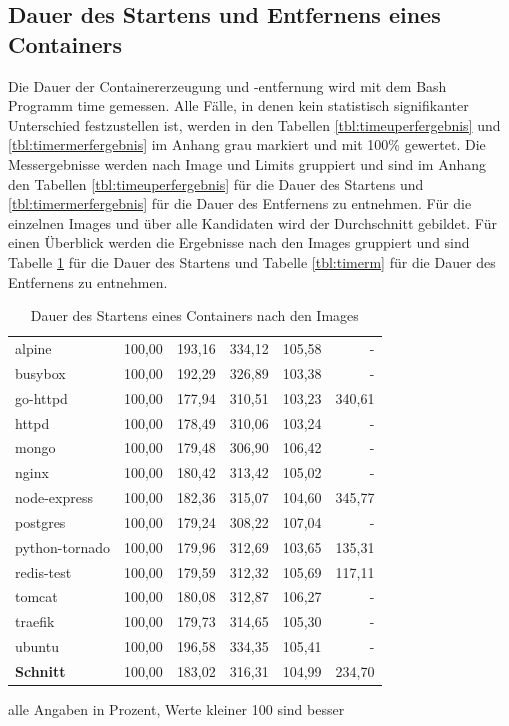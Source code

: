 \subsection{Dauer des Startens und Entfernens eines Containers}
Die Dauer der Containererzeugung und -entfernung wird mit dem Bash Programm time gemessen. Alle Fälle, in denen kein statistisch signifikanter Unterschied festzustellen ist, werden in den Tabellen \ref{tbl:timeuperfergebnis} und \ref{tbl:timermerfergebnis} im Anhang grau markiert und mit 100\% gewertet. Die Messergebnisse werden nach Image und Limits gruppiert und sind im Anhang den Tabellen \ref{tbl:timeuperfergebnis} für die Dauer des Startens und \ref{tbl:timermerfergebnis} für die Dauer des Entfernens zu entnehmen. Für die einzelnen Images und über alle Kandidaten wird der Durchschnitt gebildet. Für einen Überblick werden die Ergebnisse nach den Images gruppiert und sind Tabelle \ref{tbl:timeup} für die Dauer des Startens und Tabelle \ref{tbl:timerm} für die Dauer des Entfernens zu entnehmen.

\begin{table}[h]
	\myfloatalign
	\small 
	\begin{tabularx}{\textwidth}{Xrrrrr} \hline
		\spacedlowsmallcaps{Image} & \spacedlowsmallcaps{Docker} & \spacedlowsmallcaps{Kata} & \spacedlowsmallcaps{Kata FC} & \spacedlowsmallcaps{gVisor} & \spacedlowsmallcaps{Nabla} \\ \hline
		alpine        & 100,00 & 193,16 & 334,12  & 105,58 & -      \\
		busybox       & 100,00 & 192,29 & 326,89  & 103,38 & -      \\
		go-httpd      & 100,00 & 177,94 & 310,51  & 103,23 & 340,61 \\
		httpd         & 100,00 & 178,49 & 310,06  & 103,24 & -      \\
		mongo         & 100,00 & 179,48 & 306,90  & 106,42 & -      \\
		nginx         & 100,00 & 180,42 & 313,42  & 105,02 & -      \\
		node-express  & 100,00 & 182,36 & 315,07  & 104,60 & 345,77 \\
		postgres      & 100,00 & 179,24 & 308,22  & 107,04 & -      \\
		python-tornado& 100,00 & 179,96 & 312,69  & 103,65 & 135,31 \\
		redis-test    & 100,00 & 179,59 & 312,32  & 105,69 & 117,11 \\
		tomcat        & 100,00 & 180,08 & 312,87  & 106,27 & -      \\
		traefik       & 100,00 & 179,73 & 314,65  & 105,30 & -      \\
		ubuntu        & 100,00 & 196,58 & 334,35  & 105,41 & -      \\ \hline
		\textbf{Schnitt}   & 100,00 & 183,02 & 316,31  & 104,99 & 234,70 \\
		\hline
	\end{tabularx}
	\caption[Dauer des Startens eines Containers]{Dauer des Startens eines Containers nach den Images}
	\footnotesize alle Angaben in Prozent, Werte kleiner 100 sind besser
	\label{tbl:timeup}
\end{table}

